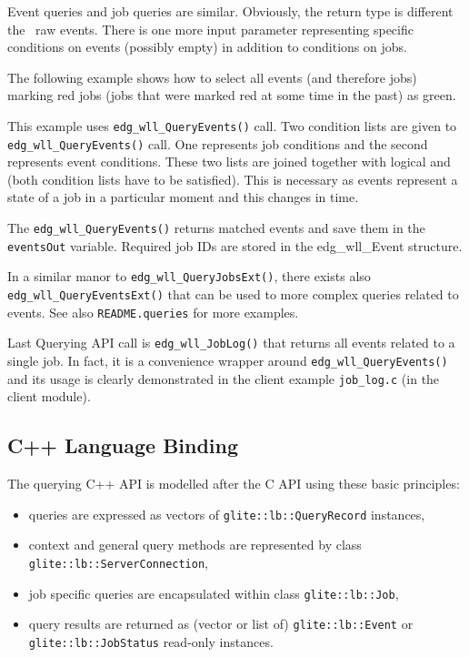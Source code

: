 Event queries and job queries are similar. Obviously, the return type is
different \Dash the \LB\ raw events. There is one more input parameter
representing specific conditions on events (possibly empty) in addition to
conditions on jobs.

The following example shows how to select all events (and therefore jobs)
marking red jobs (jobs that were marked red at some time in the past) as green.





This example uses \texttt{edg\_wll\_QueryEvents()} call. Two condition lists are
given to \texttt{edg\_wll\_QueryEvents()} call. One represents job conditions and
the second represents event conditions. These two lists are joined together with
logical and (both condition lists have to be satisfied). This is necessary as
events represent a state of a job in a particular moment and this changes in time.



The \texttt{edg\_wll\_QueryEvents()} returns matched events and save them in the
\texttt{eventsOut} variable. Required job IDs are stored in the edg\_wll\_Event
structure.



In a similar manor to \texttt{edg\_wll\_QueryJobsExt()}, there exists also \texttt{edg\_wll\_QueryEventsExt()} 
that can be used to more complex queries related to events. See also \texttt{README.queries} for more examples.


Last \LB Querying API call is \texttt{edg\_wll\_JobLog()} that returns all events related to a single job.
In fact, it is a convenience wrapper around \texttt{edg\_wll\_QueryEvents()} and its usage is clearly
demonstrated in the client example \texttt{job\_log.c} (in the client module).



\subsection{C++ Language Binding}
The querying C++ \LB API is modelled after the C \LB API using these basic principles:
\begin{itemize}
\item queries are expressed as vectors of
\verb'glite::lb::QueryRecord' instances,
\item \LB context and general query methods are represented by class
\verb'glite::lb::ServerConnection',
\item \LB job specific queries are encapsulated within class
\verb'glite::lb::Job',
\item query results are returned as (vector or list of)
\verb'glite::lb::Event' or \verb'glite::lb::JobStatus' read-only instances.
\end{itemize}


